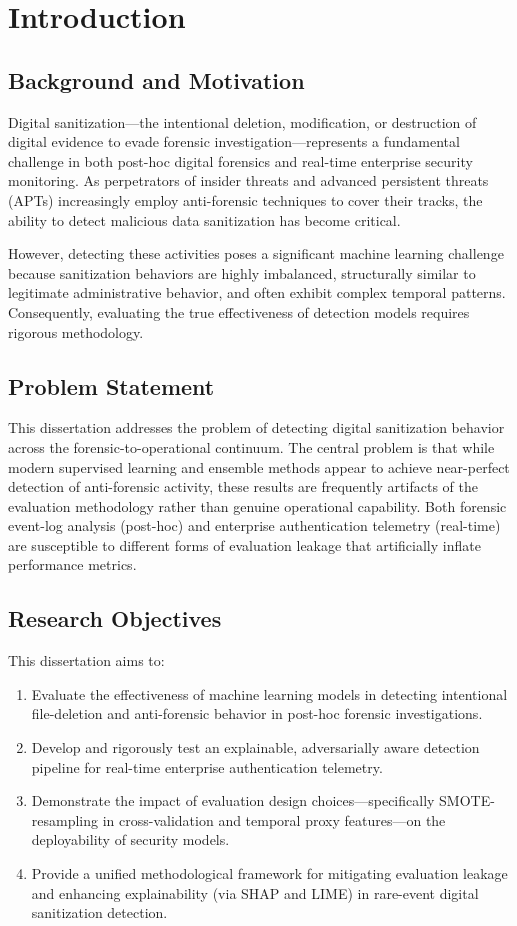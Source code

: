 \chapter{Introduction}
\label{ch:intro}

\section{Background and Motivation}
Digital sanitization---the intentional deletion, modification, or destruction of digital evidence to evade forensic investigation---represents a fundamental challenge in both post-hoc digital forensics and real-time enterprise security monitoring. As perpetrators of insider threats and advanced persistent threats (APTs) increasingly employ anti-forensic techniques to cover their tracks, the ability to detect malicious data sanitization has become critical.

However, detecting these activities poses a significant machine learning challenge because sanitization behaviors are highly imbalanced, structurally similar to legitimate administrative behavior, and often exhibit complex temporal patterns. Consequently, evaluating the true effectiveness of detection models requires rigorous methodology.

\section{Problem Statement}
This dissertation addresses the problem of detecting digital sanitization behavior across the forensic-to-operational continuum. The central problem is that while modern supervised learning and ensemble methods appear to achieve near-perfect detection of anti-forensic activity, these results are frequently artifacts of the evaluation methodology rather than genuine operational capability. Both forensic event-log analysis (post-hoc) and enterprise authentication telemetry (real-time) are susceptible to different forms of evaluation leakage that artificially inflate performance metrics.

\section{Research Objectives}
This dissertation aims to:
\begin{enumerate}
    \item Evaluate the effectiveness of machine learning models in detecting intentional file-deletion and anti-forensic behavior in post-hoc forensic investigations.
    \item Develop and rigorously test an explainable, adversarially aware detection pipeline for real-time enterprise authentication telemetry.
    \item Demonstrate the impact of evaluation design choices---specifically SMOTE-resampling in cross-validation and temporal proxy features---on the deployability of security models.
    \item Provide a unified methodological framework for mitigating evaluation leakage and enhancing explainability (via SHAP and LIME) in rare-event digital sanitization detection.
\end{enumerate}

